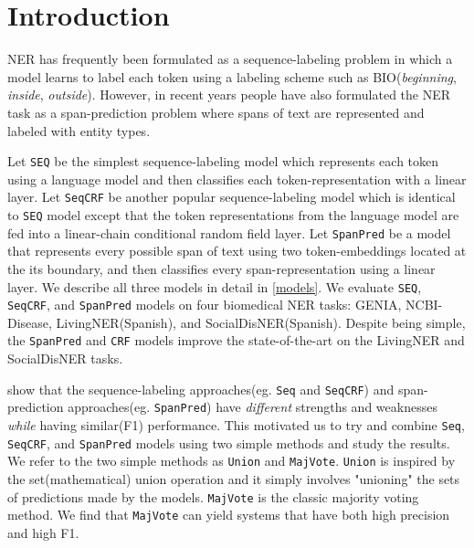 \documentclass[11pt]{article}
\begin{document}
\section{Introduction} 
NER has frequently been formulated as a sequence-labeling 
problem  \cite{chiu-nichols-2016-named, ma-hovy-2016-end, wang-etal-2022-damo} 
in which a model learns to label each token using a labeling scheme such as 
BIO(\textit{beginning}, \textit{inside},
\textit{outside}). However, in recent years people have also formulated
the NER task as a span-prediction problem
\cite{jiang-etal-2020-generalizing, li-etal-2020-unified, spanner, zhang2023optimizing}
where spans of text are represented and labeled with entity types. \par 
Let \texttt{SEQ} be the simplest sequence-labeling model
which represents each token using a language model and then 
classifies each token-representation with a linear layer. 
Let \texttt{SeqCRF} be another popular sequence-labeling model which is identical 
to \texttt{SEQ} model except that
the token representations from the language model are fed into a
linear-chain conditional random field layer\cite{lafferty2001conditional, lample-etal-2016-neural}. 
Let \texttt{SpanPred}\cite{lee-etal-2017-end, jiang-etal-2020-generalizing} be a 
model that represents every possible span of text using 
two token-embeddings located at the its boundary, 
and then classifies every span-representation using a linear layer. We describe all three models
in detail in \autoref{models}. 
We evaluate \texttt{SEQ}, \texttt{SeqCRF}, and \texttt{SpanPred} models 
on four biomedical NER tasks: GENIA\cite{kim2003genia}, NCBI-Disease\cite{dougan2014ncbi}, 
LivingNER(Spanish)\cite{miranda2022mention}, and SocialDisNER(Spanish)\cite{gasco-sanchez-etal-2022-socialdisner}. 
Despite being simple, the \texttt{SpanPred} and \texttt{CRF} models 
improve the state-of-the-art on the LivingNER and SocialDisNER tasks.\par


\cite{spanner} show that the sequence-labeling approaches(eg. \texttt{Seq} and \texttt{SeqCRF}) and span-prediction approaches(eg. \texttt{SpanPred}) have \textit{different} strengths and weaknesses \textit{while} having similar(F1) performance. This motivated us to try and combine \texttt{Seq},  \texttt{SeqCRF}, and \texttt{SpanPred} models using two simple methods and study the results. We refer to the two simple methods as \texttt{Union} and \texttt{MajVote}. \texttt{Union} is inspired by the set(mathematical) union operation and it simply involves "unioning" the sets of predictions made by the models. \texttt{MajVote} is the classic majority voting method. We find that \texttt{MajVote} can yield systems that have both high precision and high F1.
\end{document}
